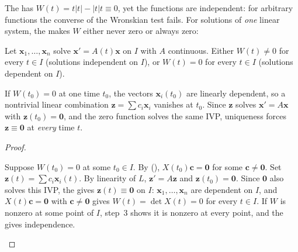 \documentclass[10pt]{scrartcl}
\newcommand{\vv}[1]{\mathbf{#1}}
\begin{document}
The  has $W(t)=t|t|-|t|t\equiv 0$, yet the functions are independent: for arbitrary functions the converse of the Wronskian test fails. For solutions of \emph{one} linear system, the  makes $W$ either never zero or always zero:

\begin{theorem*}
  Let $\vv x_1,\dots,\vv x_n$ solve $\vv x'=A(t)\vv x$ on $I$ with $A$ continuous. Either $W(t)\neq 0$ for every $t\in I$ (solutions independent on $I$), or $W(t)=0$ for every $t\in I$ (solutions dependent on $I$).
\end{theorem*}
\begin{ideabox}
  If $W(t_0)=0$ at one time $t_0$, the vectors $\vv x_i(t_0)$ are linearly dependent, so a nontrivial linear combination $\vv z=\sum c_i\vv x_i$ vanishes at $t_0$. Since $\vv z$ solves $\vv x'=A\vv x$ with $\vv z(t_0)=\vv 0$, and the zero function solves the same IVP, uniqueness forces $\vv z\equiv\vv 0$ at \emph{every} time $t$.
\end{ideabox}
\begin{proof}
  \begin{steps}
    \ii Suppose $W(t_0)=0$ at some $t_0\in I$. By (), $X(t_0)\vv c=\vv 0$ for some $\vv c\neq\vv 0$.
    \ii Set $\vv z(t)=\sum c_i\vv x_i(t)$. By linearity of $L$, $\vv z'=A\vv z$ and $\vv z(t_0)=\vv 0$.
    \ii Since $\vv 0$ also solves this IVP, the  gives $\vv z(t)\equiv\vv 0$ on $I$: $\vv x_1,\dots,\vv x_n$ are dependent on $I$, and $X(t)\vv c=\vv 0$ with $\vv c\neq\vv 0$ gives $W(t)=\det X(t)=0$ for every $t\in I$.
    \ii If $W$ is nonzero at some point of $I$, step~3 shows it is nonzero at every point, and the  gives independence. \qedhere
  \end{steps}
\end{proof}
\end{document}
